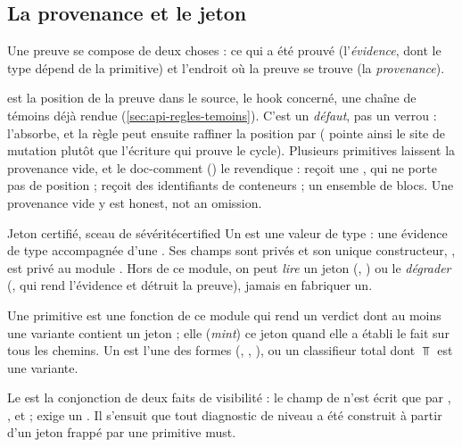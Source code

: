 \subsection{La provenance et le jeton}

Une preuve se compose de deux choses : ce qui a été prouvé (l'\emph{évidence}, dont le type dépend de la primitive) et l'endroit où la preuve se trouve (la \emph{provenance}).


 est la position de la preuve dans le source,  le hook concerné,  une chaîne de témoins déjà rendue (\cref{sec:api-regles-temoins}). C'est un \emph{défaut}, pas un verrou :  l'absorbe, et la règle peut ensuite raffiner la position par  ( pointe ainsi le site de mutation plutôt que l'écriture qui prouve le cycle). Plusieurs primitives laissent la provenance vide, et le doc-comment () le revendique :  reçoit une , qui ne porte pas de position ;  reçoit des identifiants de conteneurs ;  un ensemble de blocs. Une provenance vide y est \og honest, not an omission\fg.


\begin{definition}{Jeton certifié, sceau de sévérité}{certified}
Un  est une valeur de type  : une évidence de type  accompagnée d'une . Ses champs sont privés et son unique constructeur, , est privé au module . Hors de ce module, on peut \emph{lire} un jeton (, ) ou le \emph{dégrader} (, qui rend l'évidence et détruit la preuve), jamais en fabriquer un.

Une primitive  est une fonction de ce module qui rend un verdict dont au moins une variante contient un jeton ; elle  (\emph{mint}) ce jeton quand elle a établi le fait sur tous les chemins. Un  est l'une des formes  (, , ),  ou un classifieur total dont $\Top$ est une variante.

Le  est la conjonction de deux faits de visibilité : le champ  de  n'est écrit que par , ,  et  ;  exige un . Il s'ensuit que tout diagnostic de niveau \Error{} a été construit à partir d'un jeton frappé par une primitive must.
\end{definition}

